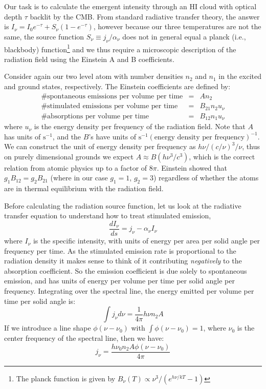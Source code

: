 Our task is to calculate the emergent intensity through an HI cloud with optical depth $\tau$ backlit by the CMB. From standard radiative transfer theory, the answer is $I_\nu=I_0e^{-\tau}+S_\nu(1-e^{-\tau})$, however because our three temperatures are not the same, the source function $S_\nu\equiv j_\nu/\alpha_\nu$ does not in general equal a planck (i.e., blackbody) function\footnote{The planck function is given by $B_\nu(T)\propto\nu^3/(e^{h\nu/kT}-1)$} and we thus require a microscopic description of the radiation field using the Einstein A and B coefficients.

Consider again our two level atom with number densities $n_2$ and $n_1$ in the excited and ground states, respectively. The Einstein coefficients are defined by:
\begin{eqnarray}
\text{\# spontaneous emissions per volume per time}&=&An_2 \nonumber\\
\text{\# stimulated emissions per volume per time}&=&B_{21}n_2u_\nu \nonumber\\
\text{\# absorptions per volume per time}&=&B_{12}n_1u_\nu 
\end{eqnarray}
where $u_\nu$ is the energy density per frequency of the radiation field. Note that $A$ has units of $\text{s}^{-1}$, and the $B$'s have units of $\text{s}^{-1}(\text{energy density per frequency})^{-1}$. We can construct the unit of energy density per frequency as $h\nu/(c/\nu)^3/\nu$, thus on purely dimensional grounds we expect $A\approx B (h\nu^3/c^3)$, which is the correct relation from atomic physics up to a factor of $8\pi$. Einstein showed that $g_1B_{12}=g_2B_{21}$ (where in our case $g_1=1$, $g_2=3$) regardless of whether the atoms are in thermal equilibrium with the radiation field.

Before calculating the radiation source function, let us look at the radiative transfer equation to understand how to treat stimulated emission,
\begin{equation}
\frac{dI_\nu}{ds}=j_\nu-\alpha_\nu I_\nu
\end{equation}
where $I_\nu$ is the specific intensity, with units of energy per area per solid angle per frequency per time. As the stimulated emission rate is proportional to the radiation density it makes sense to think of it contributing \textit{negatively} to the absorption coefficient. So the emission coefficient is due solely to spontaneous emission, and has units of energy per volume per time per solid angle per frequency. Integrating over the spectral line, the energy emitted per volume per time per solid angle is:
\begin{equation}
\int j_\nu d\nu=\frac{1}{4\pi}h\nu n_2 A
\end{equation}
If we introduce a line shape $\phi(\nu-\nu_0)$ with $\int\phi(\nu-\nu_0)=1$, where $\nu_0$ is the center frequency of the spectral line, then we have:
\begin{equation}
\boxed{j_\nu=\frac{h\nu_0 n_2A\phi(\nu-\nu_0)}{4\pi}}
\end{equation}

